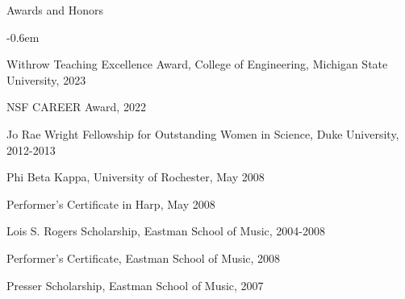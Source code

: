 \documentclass{resume} %
\begin{document}
\begin{rSection}{Awards and Honors}

\begin{list}{}{\leftmargin=0em}
   \itemsep -0.6em %
\item Withrow Teaching Excellence Award, College of Engineering, Michigan State University, 2023
\item NSF CAREER Award, 2022
\item
Jo Rae Wright Fellowship for Outstanding Women in Science, Duke University, 2012-2013

\item
Phi Beta Kappa, University of Rochester, May 2008


\item
Performer's Certificate in Harp, May 2008



\item
Lois S. Rogers Scholarship, Eastman School of Music, 2004-2008

\item Performer's Certificate, Eastman School of Music, 2008

\item
Presser Scholarship, Eastman School of Music, 2007


\end{list}


\end{rSection}


\newpage
\end{document}

